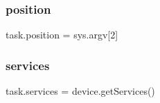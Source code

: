 \subsubsection{\texorpdfstring{position}{position}}
{\footnotesize\ttfamily task.\+position = sys.\+argv\mbox{[}2\mbox{]}}

\mbox{\label{namespacetask_a40a314326d8a939772cafc542b24a26e}} 
\subsubsection{\texorpdfstring{services}{services}}
{\footnotesize\ttfamily task.\+services = device.\+get\+Services()}

